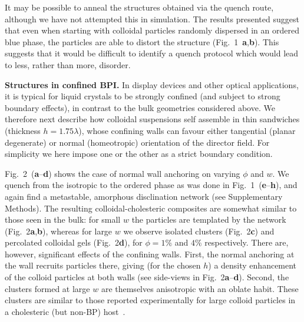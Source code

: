 \documentclass[12pt]{article}
\begin{document}
It may be possible to anneal the structures obtained via the quench route,
although we have not attempted this in simulation. The results presented
suggest that even when starting with colloidal particles randomly dispersed
in an ordered blue phase, the particles are able to distort the structure
(Fig.~1~\textbf{a},\textbf{b}). This suggests that it would be difficult
to identify a quench
protocol which would lead to less, rather than more, disorder.

\medskip
\noindent
\textbf{Structures in confined BPI.}
In display devices and other optical applications, it is typical for liquid crystals to be strongly confined (and subject to strong boundary effects), in contrast to the bulk geometries considered above. We therefore next describe how colloidal suspensions self assemble in thin sandwiches (thickness $h = 1.75 \lambda$), whose confining walls can favour either tangential (planar degenerate) or normal (homeotropic) orientation of the director field. For simplicity we here impose one or the other as a strict boundary condition.

Fig.~2~(\textbf{a}--\textbf{d}) shows the case of normal wall anchoring on
varying $\phi$ and $w$. We quench from the isotropic to the ordered phase
as was done in Fig.~1~(\textbf{e}--\textbf{h}), and again find a metastable,
amorphous disclination network
(see Supplementary Methods). The resulting colloidal-cholesteric composites
are somewhat similar to those seen in the bulk: for small $w$ the particles
are templated by the network (Fig.~2\textbf{a},\textbf{b}), whereas for
large $w$ we observe isolated clusters (Fig.~2\textbf{c}) and percolated
colloidal gels (Fig.~2\textbf{d}), for $\phi = 1\%$ and $4\%$ respectively.
There are, however, significant effects of the confining walls.
First, the normal anchoring at the wall recruits particles there,  giving
(for the chosen $h$) a density enhancement of the colloid particles at
both walls  (see side-views in Fig.~2\textbf{a}--\textbf{d}). Second,
the clusters formed at large $w$ are themselves anisotropic with an
oblate habit. These clusters
are similar to those reported experimentally for large colloid particles in a
cholesteric (but non-BP) host~\cite{niek}.
 
\end{document}
